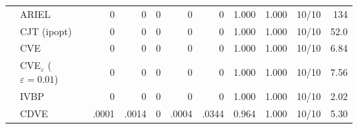 \begin{table}[htbp]
\begin{tabular}{rlrrrrrrrlr}
 & ARIEL & 0 & 0 & 0 & 0 & 0 & 1.000 & 1.000 & 10/10 & 134 \\
 & CJT (ipopt) & 0 & 0 & 0 & 0 & 0 & 1.000 & 1.000 & 10/10 & 52.0 \\
 & CVE & 0 & 0 & 0 & 0 & 0 & 1.000 & 1.000 & 10/10 & 6.84 \\
 & CVE$_\varepsilon$ ($\varepsilon{=}0.01$) & 0 & 0 & 0 & 0 & 0 & 1.000 & 1.000 & 10/10 & 7.56 \\
 & IVBP & 0 & 0 & 0 & 0 & 0 & 1.000 & 1.000 & 10/10 & 2.02 \\
 & CDVE & .0001 & .0014 & 0 & .0004 & .0344 & 0.964 & 1.000 & 10/10 & 5.30 \\
\bottomrule
\end{tabular}
\end{table}
